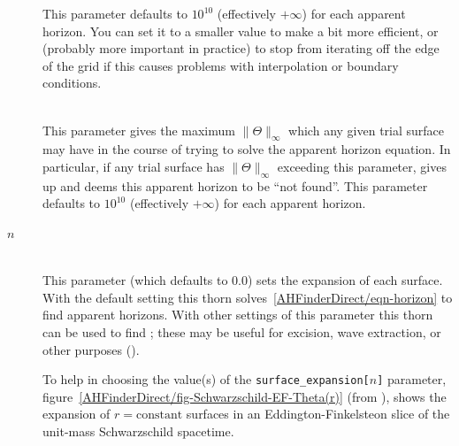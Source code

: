 \begin{description}
	This parameter defaults to $10^{10}$ (effectively $+\infty$)
	for each apparent horizon.  You can set it to a smaller value
	to make  a bit more efficient, or
	(probably more important in practice) to stop
	 from iterating off the edge of the grid
	if this causes problems with interpolation or boundary conditions.

\item[\code{max\_allowable\_Theta}]
\mbox{}\\
	This parameter gives the maximum $\|\Theta\|_\infty$
	which any given trial surface may have in the course of
	trying to solve the apparent horizon equation.
	In particular, if any trial surface has $\|\Theta\|_\infty$
	exceeding this parameter,  gives up
	and deems this apparent horizon to be ``not found''.
	This parameter defaults to $10^{10}$ (effectively $+\infty$)
	for each apparent horizon.

\item[\code{surface\_expansion[}$n$\code{]}]
\mbox{}\\
	This parameter (which defaults to 0.0) sets the expansion
	of each surface.  With the default setting this thorn
	solves~\eqref{AHFinderDirect/eqn-horizon} to find apparent
	horizons.  With other settings of this parameter this thorn
	can be used to find ;
	these may be useful for excision, wave extraction, or
	other purposes (\cite{AHFinderDirect/Schnetter03a}).

	To help in choosing the value(s) of the
	\verb|surface_expansion[|$n$\verb|]| parameter,
	figure~\ref{AHFinderDirect/fig-Schwarzschild-EF-Theta(r)}
	(from \cite{AHFinderDirect/Thornburg95}),
	shows the expansion of $r = \text{constant}$ surfaces
	in an Eddington-Finkelsteon slice of the unit-mass
	Schwarzschild spacetime.


\end{description}
